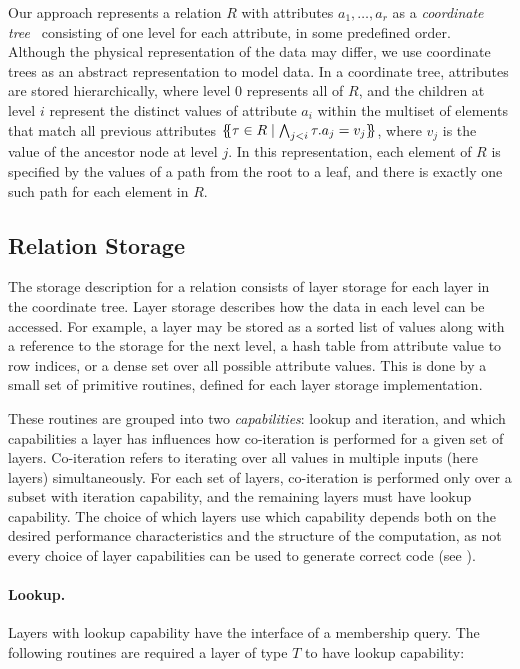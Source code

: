 \documentclass[acmsmall,screen,nonacm]{acmart}\settopmatter{printfolios=true,printccs=false,printacmref=false}
\newcommand*{\lB}{\{\mskip-5mu\{}
\newcommand*{\rB}{\}\mskip-5mu\}}
\begin{document}
Our approach represents a relation $R$ with attributes $a_1, \dots, a_r$
as a \emph{coordinate tree}~\cite{kjolstad2017}
consisting of one level for each attribute, in some predefined order.
Although the physical representation of the data may differ, we use coordinate trees as an
abstract representation to model data.
In a coordinate tree,
attributes are stored hierarchically, where level 0 represents all of $R$,
and the children at level $i$ represent the distinct values of attribute $a_i$
within the multiset of elements that match all previous attributes
$\lB \tau \in R \mid \bigwedge_{j < i} \tau.a_j = v_j \rB$, where $v_j$ is the value of the
ancestor node at level $j$.
In this representation, each element of $R$ is specified by the values of a path from the root to
a leaf, and there is exactly one such path for each element in $R$.

\subsection{Relation Storage}
The storage description for a relation consists of layer storage for
each layer in the coordinate tree.
Layer storage describes how the data in each level can be accessed.
For example, a layer may be stored as a sorted list of values along
with a reference to the storage for the next level, a hash table
from attribute value to row indices, or a dense set over all possible
attribute values. This is done by a small set of primitive routines,
defined for each layer storage implementation.

These routines are grouped into two \emph{capabilities}: lookup and iteration,
and which capabilities a layer has influences how co-iteration is performed for a given set of layers.
Co-iteration refers to iterating over all values in multiple inputs (here layers) simultaneously.
For each set of layers, co-iteration is performed only over a subset with iteration capability,
and the remaining layers must have lookup capability. The choice of which layers use which capability
depends both on the desired performance characteristics and the structure of the computation,
as not every choice of layer capabilities can be used to generate correct code (see ).

\paragraph{Lookup.} Layers with lookup capability have the interface of a membership query.
The following routines
are required a layer of type $T$ to have lookup capability:
\end{document}
